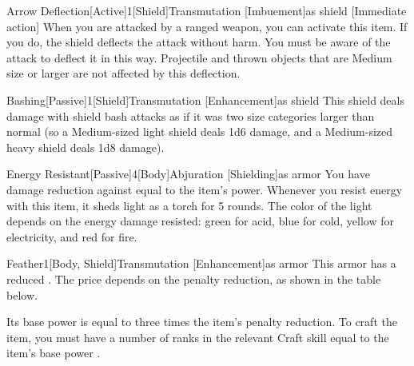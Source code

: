         \begin{magicitemdef}{Arrow Deflection}[Active]{1}[Shield]{Transmutation [Imbuement]}{as shield}
            [Immediate action] When you are attacked by a ranged weapon, you can activate this item.
            If you do, the shield deflects the attack without harm.
            You must be aware of the attack to deflect it in this way.
            Projectile and thrown objects that are Medium size or larger are not affected by this deflection.
        \end{magicitemdef}

        \begin{magicitemdef}{Bashing}[Passive]{1}[Shield]{Transmutation [Enhancement]}{as shield}
             This shield deals damage with shield bash attacks as if it was two size categories larger than normal (so a Medium-sized light shield deals 1d6 damage, and a Medium-sized heavy shield deals 1d8 damage).
        \end{magicitemdef}

        \begin{magicitemdef}{Energy Resistant}[Passive]{4}[Body]{Abjuration [Shielding]}{as armor}
             You have damage reduction against  equal to the item's power.
            Whenever you resist energy with this item, it sheds light as a torch for 5 rounds.
            The color of the light depends on the energy damage resisted: green for acid, blue for cold, yellow for electricity, and red for fire.
        \end{magicitemdef}

        \begin{magicitemdef}{Feather}{1}[Body, Shield]{Transmutation [Enhancement]}{as armor}
             This armor has a reduced .
            The price depends on the penalty reduction, as shown in the table below.

            Its base power is equal to three times the item's penalty reduction.
            To craft the item, you must have a number of ranks in the relevant Craft skill equal to the item's base power .
        \end{magicitemdef}

